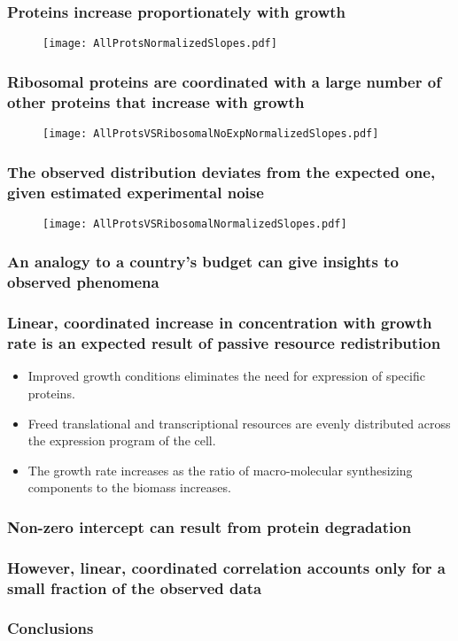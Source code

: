 \documentclass{beamer}
\begin{document}
\begin{frame}
\frametitle{Proteins increase proportionately with growth}
\begin{figure}[h!]
\centering
\texttt{[image: AllProtsNormalizedSlopes.pdf]}
\end{figure}
\end{frame}

\begin{frame}
\frametitle{Ribosomal proteins are coordinated with a large number of other proteins that increase with growth}
\begin{figure}[h!]
\centering
\texttt{[image: AllProtsVSRibosomalNoExpNormalizedSlopes.pdf]}
\end{figure}
\end{frame}

\begin{frame}
\frametitle{The observed distribution deviates from the expected one, given estimated experimental noise}
\begin{figure}[h!]
\centering
\texttt{[image: AllProtsVSRibosomalNormalizedSlopes.pdf]}
\end{figure}
\end{frame}

\begin{frame}
\frametitle{An analogy to a country's budget can give insights to observed phenomena}
\end{frame}

\begin{frame}
\frametitle{Linear, coordinated increase in concentration with growth rate is an expected result of passive resource redistribution}
\begin{itemize}
\item Improved growth conditions eliminates the need for expression of specific proteins.
\item Freed translational and transcriptional resources are evenly distributed across the expression program of the cell.
\item The growth rate increases as the ratio of macro-molecular synthesizing components to the biomass increases.
\end{itemize}
\end{frame}

\begin{frame}
\frametitle{Non-zero intercept can result from protein degradation}
\end{frame}

\begin{frame}
\frametitle{However, linear, coordinated correlation accounts only for a small fraction of the observed data}
\end{frame}
\begin{frame}
\frametitle{Conclusions}
\end{frame}
\end{document}
